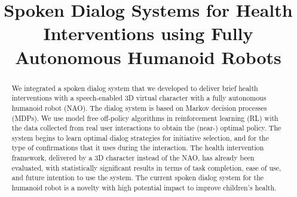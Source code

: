 \documentclass[letterpaper]{article}
\begin{document}
 \begin{sloppy}
%
\title{Spoken Dialog Systems for Health Interventions using Fully Autonomous Humanoid Robots}


\maketitle
\begin{abstract}
We integrated a spoken dialog system that we developed to deliver brief health interventions with a 
speech-enabled 3D virtual character with a fully autonomous humanoid robot (NAO). The dialog 
system is based on Markov decision processes (MDPs). We use model free off-policy algorithms in 
reinforcement learning (RL) with the data  collected from real user interactions to obtain the 
(near-) optimal policy. The system begins to learn optimal dialog strategies for initiative 
selection, and for the type of confirmations that it uses during the interaction. The health 
intervention framework, delivered by a 3D character instead of the NAO, has already been evaluated, 
with statistically significant results in terms of task completion, ease of use, and future 
intention to use the system.  The current spoken dialog system for the humanoid robot is a novelty with high potential impact to improve children's health.
\end{abstract}



\end{sloppy}
\end{document}
